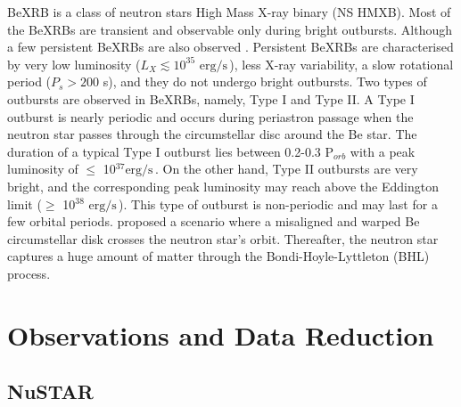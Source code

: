 \documentclass[12pt,a4paper,fleqn,usenatbib]{mnras}
\newcommand{\unilum}{$\text{erg}/\text{s}\,$}
\begin{document}
BeXRB is a class of neutron stars High Mass X-ray binary (NS HMXB). Most of the BeXRBs are transient and observable only during bright outbursts. Although a few persistent BeXRBs are also observed \citep{2011Ap&SS.332....1R}. Persistent BeXRBs are characterised by very low luminosity ($L_{X}\lesssim10^{35}$ \unilum), less X-ray variability, a slow rotational period ($P_{s}>200$ s), and they do not undergo bright outbursts. Two types of outbursts are observed in BeXRBs, namely, Type I and Type II. A Type I outburst is nearly periodic and occurs during periastron passage when the neutron star passes through the circumstellar disc around the Be star. The duration of a typical Type I outburst lies between 0.2-0.3 P$_{orb}$ \citep{2011Ap&SS.332....1R} with a peak luminosity of $\le$ 10$^{37}$\unilum. On the other hand, Type II outbursts are very bright, and the corresponding peak luminosity may reach above the Eddington limit ($\ge$ 10$^{38}$ \unilum). This type of outburst is non-periodic and may last for a few orbital periods. \cite{Okazaki2013OriginOT} proposed a scenario where a misaligned and warped Be circumstellar disk crosses the neutron star's orbit. Thereafter, the neutron star captures a huge amount of matter through the Bondi-Hoyle-Lyttleton (BHL) process.



\section{Observations and Data Reduction}
\subsection{NuSTAR}
\end{document}
